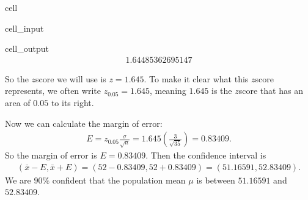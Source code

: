 \documentclass[letterpaper,10pt,english]{jupyterBook}
\begin{document}
\begin{sphinxuseclass}{cell}\begin{sphinxVerbatimInput}

\begin{sphinxuseclass}{cell_input}
\begin{sphinxVerbatim}[commandchars=\\\{\}]
\end{sphinxVerbatim}

\end{sphinxuseclass}\end{sphinxVerbatimInput}
\begin{sphinxVerbatimOutput}

\begin{sphinxuseclass}{cell_output}\begin{equation*}
\begin{split}1.64485362695147\end{split}
\end{equation*}
\end{sphinxuseclass}\end{sphinxVerbatimOutput}

\end{sphinxuseclass}
\sphinxAtStartPar
So the \(z\)\sphinxhyphen{}score we will use is \(z = 1.645\). To make it clear what this \(z\)\sphinxhyphen{}score represents, we often write \(z_{0.05} = 1.645\), meaning \(1.645\) is the \(z\)\sphinxhyphen{}score that has an area of \(0.05\) to its right.

\sphinxAtStartPar
Now we can calculate the margin of error:
\begin{equation*}
\begin{split} E = z_{0.05}\frac{\sigma}{\sqrt{n}} = 1.645\left(\frac{3}{\sqrt{35}}\right) = 0.83409. \end{split}
\end{equation*}
\sphinxAtStartPar
So the margin of error is \(E = 0.83409\). Then the confidence interval is
\begin{equation*}
\begin{split} (\bar{x} - E, \bar{x} + E) = (52 - 0.83409, 52 + 0.83409) = (51.16591, 52.83409). \end{split}
\end{equation*}
\sphinxAtStartPar
We are \(90\%\) confident that the population mean \(\mu\) is between \(51.16591\) and \(52.83409\).
\end{document}
